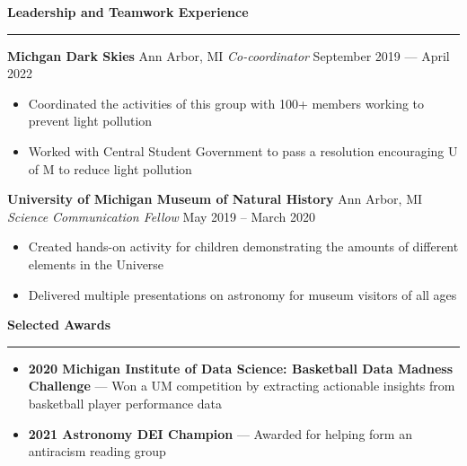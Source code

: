 \documentclass[10pt]{article}
\newcommand{\header}[1]{\vspace{1.5em}\par \textbf{\large #1}\strut\hrule\vspace{-0.9em}}
\newcommand{\actionHeader}[2]{\vspace{0.6em}\textbf{#1} \hfill #2}
\newcommand{\actionHeaderSecondLine}[2]{\newline \textit{#1} \hfill #2}
\begin{document}
\header{Leadership and Teamwork Experience}
\actionHeader{Michgan Dark Skies}{Ann Arbor, MI}
\actionHeaderSecondLine{Co-coordinator}{September 2019 --- April 2022}
\begin{itemize}
    \item Coordinated the activities of this group with 100+ members working to prevent light pollution
    \item Worked with Central Student Government to pass a resolution encouraging U of M to reduce light pollution
\end{itemize}



\actionHeader{University of Michigan Museum of Natural History}{Ann Arbor, MI}
\actionHeaderSecondLine{Science Communication Fellow}{May 2019 -- March 2020}
\begin{itemize}
    \item Created hands-on activity for children demonstrating the amounts of different elements in the Universe
    \item Delivered multiple presentations on astronomy for museum visitors of all ages
\end{itemize}

\header{Selected Awards}
\vspace{1.1em}
\begin{itemize}
    \item {\bf 2020 Michigan Institute of Data Science: Basketball Data Madness Challenge} --- Won a UM competition by extracting actionable insights from basketball player performance data
    \item {\bf 2021 Astronomy DEI Champion} --- Awarded for helping form an antiracism reading group
\end{itemize}
\end{document}
